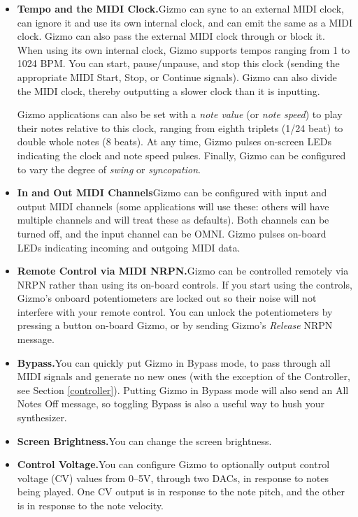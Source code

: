 \documentclass{article}
\begin{document}
\begin{itemize}
\item {\bf Tempo and the MIDI Clock.}\quad Gizmo can sync to an external MIDI clock, can ignore it and use its own internal clock, and can emit the same as a MIDI clock.  Gizmo can also pass the external MIDI clock through or block it.  When using its own internal clock, Gizmo supports tempos ranging from 1 to 1024 BPM.  You can start, pause/unpause, and stop this clock (sending the appropriate MIDI Start, Stop, or Continue signals).  Gizmo can also divide the MIDI clock, thereby outputting a slower clock than it is inputting.

Gizmo applications can also be set with a {\it note value} (or {\it note speed}) to play their notes relative to this clock, ranging from eighth triplets (1/24 beat) to double whole notes (8 beats).  At any time, Gizmo pulses on-screen LEDs indicating the clock and note speed pulses.  Finally, Gizmo can be configured to vary the degree of {\it swing} or {\it syncopation}.

\item {\bf In and Out MIDI Channels}\quad Gizmo can be configured with input and output MIDI channels (some applications will use these: others will have multiple channels and will treat these as defaults).  Both channels can be turned off, and the input channel can be OMNI.  Gizmo pulses on-board LEDs indicating incoming and outgoing MIDI data.  

\item {\bf Remote Control via MIDI NRPN.}\quad Gizmo can be controlled remotely via NRPN rather than using its on-board controls.  If you start using the controls, Gizmo's onboard potentiometers are locked out so their noise will not interfere with your remote control.  You can unlock the potentiometers by pressing a button on-board Gizmo, or by sending Gizmo's {\it Release} NRPN message.

\item {\bf Bypass.}\quad You can quickly put Gizmo in Bypass mode, to pass through all MIDI signals and generate no new ones (with the exception of the Controller, see Section \ref{controller}).  Putting Gizmo in Bypass mode will also send an All Notes Off message, so toggling Bypass is also a useful way to hush your synthesizer.

\item {\bf Screen Brightness.}\quad You can change the screen brightness.  

\item {\bf Control Voltage.}\quad You can configure Gizmo to optionally output control voltage (CV) values from 0--5V, through two DACs, in response to notes being played.    One CV output is in response to the note pitch, and the other is in response to the note velocity.


\end{itemize}
\end{document}
